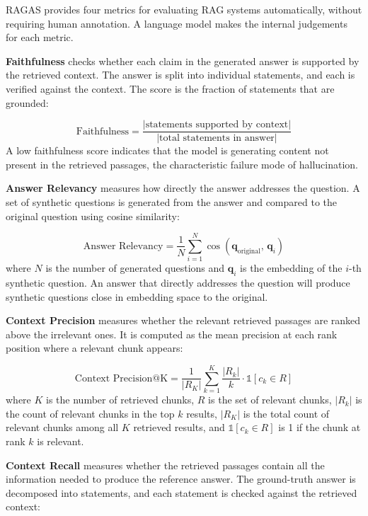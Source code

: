 RAGAS \cite{es2024ragas} provides four metrics for evaluating RAG 
systems automatically, without requiring human annotation. A language 
model makes the internal judgements for each metric.

\textbf{Faithfulness} checks whether each claim in the generated 
answer is supported by the retrieved context. The answer is split 
into individual statements, and each is verified against the context. 
The score is the fraction of statements that are grounded:

\begin{equation}
    \text{Faithfulness} = 
    \frac{|\text{statements supported by context}|}
         {|\text{total statements in answer}|}
\end{equation}
A low faithfulness score indicates that the model is generating 
content not present in the retrieved passages, the characteristic 
failure mode of hallucination.

\textbf{Answer Relevancy} measures how directly the answer addresses 
the question. A set of synthetic questions is generated from the 
answer and compared to the original question using cosine similarity:

\begin{equation}
    \text{Answer Relevancy} = 
    \frac{1}{N}\sum_{i=1}^{N} 
    \cos\!\left(\mathbf{q}_{\text{original}},\, \mathbf{q}_{i}\right)
\end{equation}
where $N$ is the number of generated questions and $\mathbf{q}_i$ 
is the embedding of the $i$-th synthetic question. An answer that 
directly addresses the question will produce synthetic questions 
close in embedding space to the original.

\textbf{Context Precision} measures whether the relevant retrieved 
passages are ranked above the irrelevant ones. It is computed as 
the mean precision at each rank position where a relevant chunk 
appears:

\begin{equation}
    \text{Context Precision@K} = 
    \frac{1}{|R_K|}\sum_{k=1}^{K} 
    \frac{|R_k|}{k} \cdot \mathbb{1}[c_k \in R]
\end{equation}
where $K$ is the number of retrieved chunks, $R$ is the set of 
relevant chunks, $|R_k|$ is the count of relevant chunks in the 
top $k$ results, $|R_K|$ is the total count of relevant chunks 
among all $K$ retrieved results, and $\mathbb{1}[c_k \in R]$ 
is 1 if the chunk at rank $k$ is relevant.

\textbf{Context Recall} measures whether the retrieved passages 
contain all the information needed to produce the reference answer. 
The ground-truth answer is decomposed into statements, and each 
statement is checked against the retrieved context:

